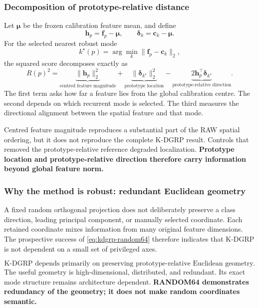 \subsubsection{Decomposition of prototype-relative distance}

Let $\bm\mu$ be the frozen calibration feature mean, and define
\begin{equation}
    \bm h_p=\bm f_p-\bm\mu,
    \qquad
    \bm\delta_k=\bm c_k-\bm\mu.
\end{equation}
For the selected nearest robust mode
\begin{equation}
    k^\star(p)=\arg\min_k\|\bm f_p-\bm c_k\|_2,
\end{equation}
the squared score decomposes exactly as
\begin{equation}
    \boxed{
    R(p)^2=
    \underbrace{\|\bm h_p\|_2^2}_{\text{centred feature magnitude}}
    +\underbrace{\|\bm\delta_{k^\star}\|_2^2}_{\text{prototype location}}
    -\underbrace{2\bm h_p^\top\bm\delta_{k^\star}}_{
        \text{prototype-relative direction}}.}
    \label{eq:kdgrp-decomposition}
\end{equation}
The first term asks how far a feature lies from the global calibration centre.
The second depends on which recurrent mode is selected. The third measures the
directional alignment between the spatial feature and that mode.

Centred feature magnitude reproduces a substantial part of the RAW spatial
ordering, but it does not reproduce the complete K-DGRP result. Controls that
removed the prototype-relative reference degraded localization.
\textbf{Prototype location and prototype-relative direction therefore carry
information beyond global feature norm.}

\subsubsection{Why the method is robust: redundant Euclidean geometry}

A fixed random orthogonal projection does not deliberately preserve a class
direction, leading principal component, or manually selected coordinate. Each
retained coordinate mixes information from many original feature dimensions.
The prospective success of \cref{eq:kdgrp-random64} therefore indicates that
K-DGRP is not dependent on a small set of privileged axes.

\begin{equation}
    \boxed{
    \text{K-DGRP depends primarily on preserving
    prototype-relative Euclidean geometry.}}
\end{equation}
The useful geometry is high-dimensional, distributed, and redundant. Its exact
mode structure remains architecture dependent. \textbf{RANDOM64 demonstrates
redundancy of the geometry; it does not make random coordinates semantic.}

